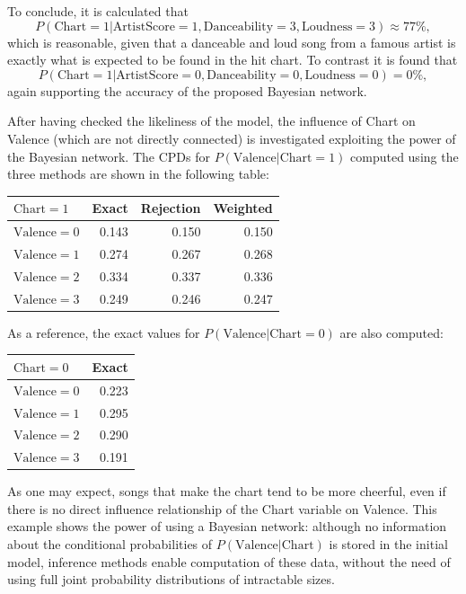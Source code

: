 \documentclass[a4paper, 12pt]{article}
\begin{document}
To conclude, it is calculated that
\[
    P\left(\mathrm{Chart} = 1 | \mathrm{ArtistScore} = 1, \mathrm{Danceability} = 3, \mathrm{Loudness} = 3\right) \approx 77\%,
\]
which is reasonable, given that a danceable and loud song from a famous artist is exactly what is expected to be found in the hit chart. To contrast it is found that
\[
    P\left(\mathrm{Chart} = 1 | \mathrm{ArtistScore} = 0, \mathrm{Danceability} = 0, \mathrm{Loudness} = 0\right) = 0\%,
\]
again supporting the accuracy of the proposed Bayesian network.

After having checked the likeliness of the model, the influence of Chart on Valence (which are not directly connected) is investigated exploiting the power of the Bayesian network. The CPDs for $P\left(\mathrm{Valence} | \mathrm{Chart} = 1\right)$ computed using the three methods are shown in the following table:
\begin{center}
    \begin{tabular}{lrrr}
        \toprule
        $\mathrm{Chart} = 1$   & Exact & Rejection & Weighted \\
        \midrule
        $\mathrm{Valence} = 0$ & 0.143 & 0.150     & 0.150    \\
        $\mathrm{Valence} = 1$ & 0.274 & 0.267     & 0.268    \\
        $\mathrm{Valence} = 2$ & 0.334 & 0.337     & 0.336    \\
        $\mathrm{Valence} = 3$ & 0.249 & 0.246     & 0.247    \\
        \bottomrule
    \end{tabular}
\end{center}

As a reference, the exact values for $P\left(\mathrm{Valence} | \mathrm{Chart} = 0\right)$ are also computed:
\begin{center}
    \begin{tabular}{lr}
        \toprule
        $\mathrm{Chart} = 0$   & Exact \\
        \midrule
        $\mathrm{Valence} = 0$ & 0.223 \\
        $\mathrm{Valence} = 1$ & 0.295 \\
        $\mathrm{Valence} = 2$ & 0.290 \\
        $\mathrm{Valence} = 3$ & 0.191 \\
        \bottomrule
    \end{tabular}
\end{center}

As one may expect, songs that make the chart tend to be more cheerful, even if there is no direct influence relationship of the Chart variable on Valence. This example shows the power of using a Bayesian network: although no information about the conditional probabilities of $P\left(\mathrm{Valence} | \mathrm{Chart}\right)$ is stored in the initial model, inference methods enable computation of these data, without the need of using full joint probability distributions of intractable sizes.
\end{document}
